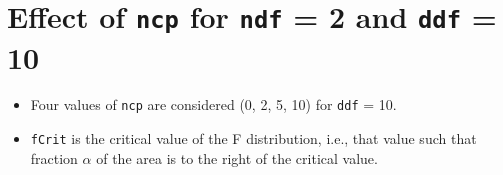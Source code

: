 \documentclass[]{book}
\providecommand{\tightlist}{%
  \setlength{\itemsep}{0pt}\setlength{\parskip}{0pt}}
\begin{document}
\hypertarget{effect-of-ncp-for-ndf-2-and-ddf-10}{%
\section{\texorpdfstring{Effect of \texttt{ncp} for \texttt{ndf} = 2 and \texttt{ddf} = 10}{Effect of ncp for ndf = 2 and ddf = 10}}\label{effect-of-ncp-for-ndf-2-and-ddf-10}}

\begin{itemize}
\tightlist
\item
  Four values of \texttt{ncp} are considered (0, 2, 5, 10) for \texttt{ddf} = 10.
\item
  \texttt{fCrit} is the critical value of the F distribution, i.e., that value such that fraction \(\alpha\) of the area is to the right of the critical value.
\end{itemize}
\end{document}
